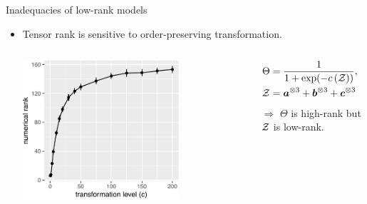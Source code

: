 \documentclass[10pt, mathserif]{beamer} %
\theoremstyle{definition}
\theoremstyle{plain}
\begin{document}
\begin{frame}{Inadequacies of  low-rank models}
 \begin{itemize}         
  \item Tensor rank is sensitive to order-preserving transformation.
\begin{columns}
\begin{column}{0.5\textwidth}
   \begin{center}
     \includegraphics[width=0.7\textwidth]{Figures/example1.pdf}
     \end{center}
\end{column}
\begin{column}{0.6\textwidth} 
\begin{align}
\Theta &= {1\over 1+\exp(-c\left(\mathcal{Z}\right))},\quad\text{where }\\ 
\mathcal{Z} &= \bm a^{\otimes3}+ \bm b^{\otimes3}+ \bm c^{\otimes3}
\end{align}
$\Rightarrow$ $\Theta$ is high-rank but $\mathcal{Z}$ is low-rank. 
\end{column}
\end{columns}
      
   \pause   
   

\end{itemize}
\end{frame}
\end{document}
